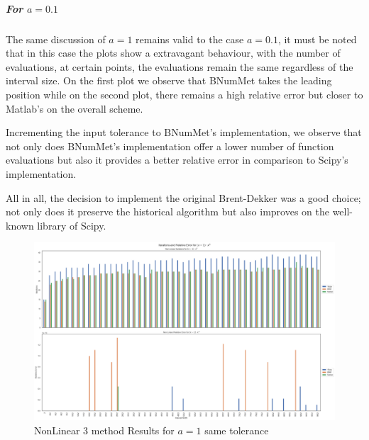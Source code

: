 \subparagraph{For $a=0.1$}
The same discussion of $a=1$ remains valid to the case $a=0.1$, it must be noted that in this case the plots show a extravagant behaviour, with the number of evaluations, at certain points, the evaluations remain the same regardless of the interval size. On the first plot  we observe that BNumMet takes the leading position while on the second plot, there remains a high relative error but closer to Matlab's on the overall scheme.

Incrementing the input tolerance to BNumMet's implementation, we observe  that not only does BNumMet's implementation offer a lower number of function evaluations but also it provides a better relative error in comparison to Scipy's implementation.

All in all, the decision to implement the original Brent-Dekker was a good choice; not only does it preserve the historical algorithm but also improves on the well-known library of Scipy.

\begin{figure}
    \centering
    \includegraphics[width=\textwidth]{Include/Images/Thesis/Analysis of Solutions/NonLinear AS/NonLinear 3 method Results a-1.png}
    \caption{NonLinear 3 method Results for $a=1$ same tolerance}
    \label{fig:NonLinear 3 method Results for a=1 same tolerance}
\end{figure}

